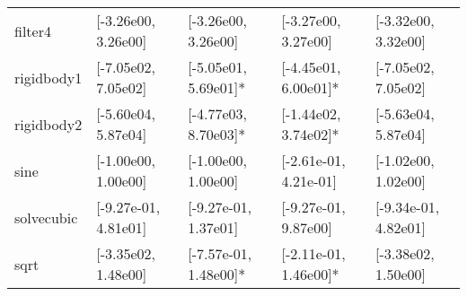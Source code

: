 \begin{table*}[tb]
\begin{tabular}{@{}p{1.4cm}L{2.55cm}L{2.7cm}L{2.6cm}L{2.5cm}@{}}
		filter4 & [-3.26e00, 3.26e00] & [-3.26e00, 3.26e00] & [-3.27e00, 3.27e00] & [-3.32e00, 3.32e00] \\
		\mydashline{}
		rigidbody1 & [-7.05e02, 7.05e02] & [-5.05e01, 5.69e01]* & [-4.45e01, 6.00e01]* & [-7.05e02, 7.05e02]\\
		\mydashline{}
		rigidbody2 & [-5.60e04, 5.87e04] & [-4.77e03, 8.70e03]* & [-1.44e02, 3.74e02]* & [-5.63e04, 5.87e04] \\
		\mydashline{}
		sine & [-1.00e00, 1.00e00] & [-1.00e00, 1.00e00] & [-2.61e-01, 4.21e-01] & [-1.02e00, 1.02e00]\\
		\mydashline{}
		solvecubic & [-9.27e-01, 4.81e01] & [-9.27e-01, 1.37e01] & [-9.27e-01, 9.87e00] & [-9.34e-01, 4.82e01]\\
		\mydashline{}
		sqrt & [-3.35e02, 1.48e00] & [-7.57e-01, 1.48e00]* & [-2.11e-01, 1.46e00]* & [-3.38e02, 1.50e00] \\

\end{tabular}
\end{table*}
